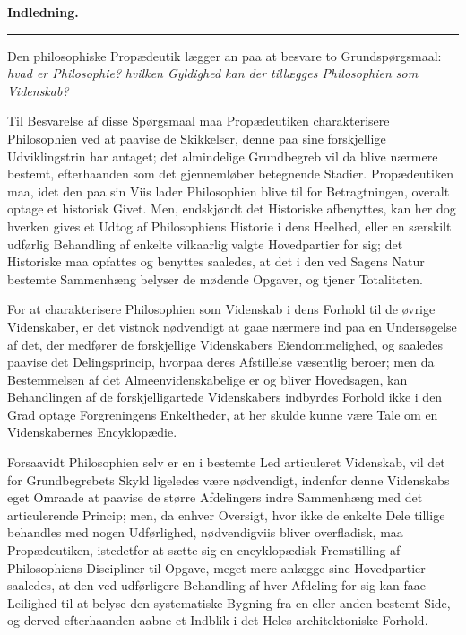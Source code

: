 \documentclass[12pt]{book}
\newcommand{\opage}[1]{\marginnote{\footnotesize\textit{[#1]}}}
\begin{document}
\tableofcontents
\mainmatter


\opage{3} \begin{center}
  {\Large\bfseries Indledning.}\par\vspace{4pt}
  \rule{2.5cm}{0.4pt}
\end{center}
{}

\noindent Den philosophiske Propædeutik lægger an paa at besvare to
Grundspørgsmaal: \emph{hvad er Philosophie?} \emph{hvilken Gyldighed kan der
tillægges Philosophien som Videnskab?}

Til Besvarelse af disse Spørgsmaal maa Propædeutiken charakterisere Philosophien
ved at paavise de Skikkelser, denne paa sine forskjellige Udviklingstrin har
antaget; det almindelige Grundbegreb vil da blive nærmere bestemt, efterhaanden
som det gjennemløber betegnende Stadier. Propædeutiken maa, idet den paa sin Viis
lader Philosophien blive til for Betragtningen, overalt optage et historisk Givet.
Men, endskjøndt det Historiske afbenyttes, kan her dog hverken gives et Udtog af
Philosophiens Historie i dens Heelhed, eller en særskilt udførlig Behandling af
enkelte vilkaarlig valgte Hovedpartier for sig; det Historiske maa opfattes og
benyttes saaledes, at det i den ved Sagens Natur bestemte Sammenhæng belyser de
mødende Opgaver, og tjener Totaliteten.

For at charakterisere Philosophien som Videnskab i dens Forhold til de øvrige
Videnskaber, er det vistnok nødvendigt at gaae nærmere ind paa en Undersøgelse af
det, der medfører de forskjellige Videnskabers Eiendommelighed, og saaledes
paavise det Delingsprincip, hvorpaa deres Afstillelse
\opage{4} væsentlig beroer; men da Bestemmelsen af det Almeenvidenskabelige er og bliver
Hovedsagen, kan Behandlingen af de forskjelligartede Videnskabers indbyrdes
Forhold ikke i den Grad optage Forgreningens Enkeltheder, at her skulde kunne være
Tale om en Videnskabernes Encyklopædie.

Forsaavidt Philosophien selv er en i bestemte Led articuleret Videnskab, vil det
for Grundbegrebets Skyld ligeledes være nødvendigt, indenfor denne Videnskabs eget
Omraade at paavise de større Afdelingers indre Sammenhæng med det articulerende
Princip; men, da enhver Oversigt, hvor ikke de enkelte Dele tillige behandles med
nogen Udførlighed, nødvendigviis bliver overfladisk, maa Propædeutiken, istedetfor
at sætte sig en encyklopædisk Fremstilling af Philosophiens Discipliner til
Opgave, meget mere anlægge sine Hovedpartier saaledes, at den ved udførligere
Behandling af hver Afdeling for sig kan faae Leilighed til at belyse den
systematiske Bygning fra en eller anden bestemt Side, og derved efterhaanden aabne
et Indblik i det Heles architektoniske Forhold.
\end{document}
